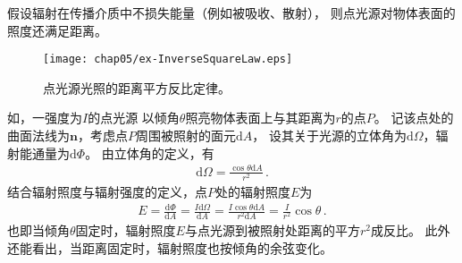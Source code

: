 \begin{proposition}
      假设辐射在传播介质中不损失能量（例如被吸收、散射），
      则点光源对物体表面的照度还满足距离。
\end{proposition}
\begin{figure}[htbp]
      \centering
      \texttt{[image: chap05/ex-InverseSquareLaw.eps]}
      \caption{点光源光照的距离平方反比定律。}
      \label{fig:5.ex-InverseSquareLaw}
\end{figure}
\begin{prove}
      如，一强度为$I$的点光源
      以倾角$\theta$照亮物体表面上与其距离为$r$的点$P$。
      记该点处的曲面法线为$\bm n$，考虑点$P$周围被照射的面元$\mathrm{d}A$，
      设其关于光源的立体角为$\mathrm{d}\varOmega$，辐射能通量为$\mathrm{d}\varPhi$。
      由立体角的定义，有
      \begin{align}
            \mathrm{d}\varOmega=\frac{\cos\theta\mathrm{d}A}{r^2}\, .
      \end{align}
      结合辐射照度与辐射强度的定义，点$P$处的辐射照度$E$为
      \begin{align}
            E=\frac{\mathrm{d}\varPhi}{\mathrm{d}A}=\frac{I\mathrm{d}\varOmega}{\mathrm{d}A}=\frac{I\cos\theta\mathrm{d}A}{r^2\mathrm{d}A}=\frac{I}{r^2}\cos\theta\, .
      \end{align}
      也即当倾角$\theta$固定时，辐射照度$E$与点光源到被照射处距离的平方$r^2$成反比。
      此外还能看出，当距离固定时，辐射照度也按倾角的余弦变化。
\end{prove}

